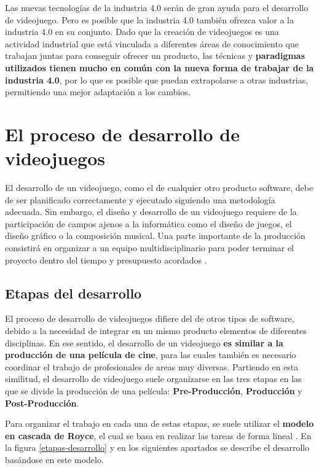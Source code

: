 Las nuevas tecnologías de la industria 4.0 serán de gran ayuda para el desarrollo de videojuego. Pero es posible que la industria 4.0 también ofrezca valor a la industria 4.0 en su conjunto. Dado que la creación de videojuegos es una actividad industrial que está vinculada a diferentes áreas de conocimiento que trabajan juntas para conseguir ofrecer un producto, las técnicas y \textbf{paradigmas utilizados tienen mucho en común con la nueva forma de trabajar de la industria 4.0}, por lo que es posible que puedan extrapolarse a otras industrias, permitiendo una mejor adaptación a los cambios.

\section{El proceso de desarrollo de videojuegos}
El desarrollo de un videojuego, como el de cualquier otro producto software, debe de ser planificado correctamente y ejecutado siguiendo una metodología adecuada. Sin embargo, el diseño y desarrollo de un videojuego requiere de la participación de campos ajenos a la informática como el diseño de juegos, el diseño gráfico o la composición musical. Una parte importante de la producción consistirá en organizar a un equipo multidisciplinario para poder terminar el proyecto dentro del tiempo y presupuesto acordados \cite{libro_esi}.

\subsection{Etapas del desarrollo}
El proceso de desarrollo de videojuegos difiere del de otros tipos de software, debido a la necesidad de integrar en un mismo producto elementos de diferentes disciplinas. En ese sentido, el desarrollo de un videojuego \textbf{es similar a la producción de una película de cine}, para las cuales también es necesario coordinar el trabajo de profesionales de areas muy diversas. Partiendo en esta similitud, el desarrollo de videojuego suele organizarse en las tres etapas en las que se divide la producción de una película: \textbf{Pre-Producción}, \textbf{Producción} y \textbf{Post-Producción}.

Para organizar el trabajo en cada una de estas etapas, se suele utilizar el \textbf{modelo en cascada de Royce}, el cual se basa en realizar las tareas de forma lineal \cite{libro_esi}. En la figura \ref{etapas-desarrollo} y en los siguientes apartados se describe el desarrollo basándose en este modelo. 

